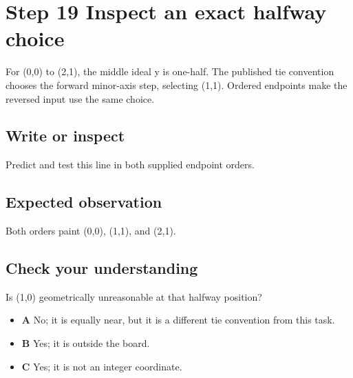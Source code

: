 \section{Step 19 Inspect an exact halfway
  choice}\label{007-bresenham-line-s19-step-19-inspect-an-exact-halfway-choice}

For (0,0) to (2,1), the middle ideal y is one-half. The published tie
convention chooses the forward minor-axis step, selecting (1,1). Ordered
endpoints make the reversed input use the same choice.

\subsection{Write or
  inspect}\label{007-bresenham-line-s19-write-or-inspect}

Predict and test this line in both supplied endpoint orders.

\subsection{Expected
  observation}\label{007-bresenham-line-s19-expected-observation}

Both orders paint (0,0), (1,1), and (2,1).

\subsection{Check your
  understanding}\label{007-bresenham-line-s19-check-your-understanding}

Is (1,0) geometrically unreasonable at that halfway position?

\begin{itemize}
  \tightlist
  \item
        \textbf{A} No; it is equally near, but it is a different tie
        convention from this task.
  \item
        \textbf{B} Yes; it is outside the board.
  \item
        \textbf{C} Yes; it is not an integer coordinate.
\end{itemize}
